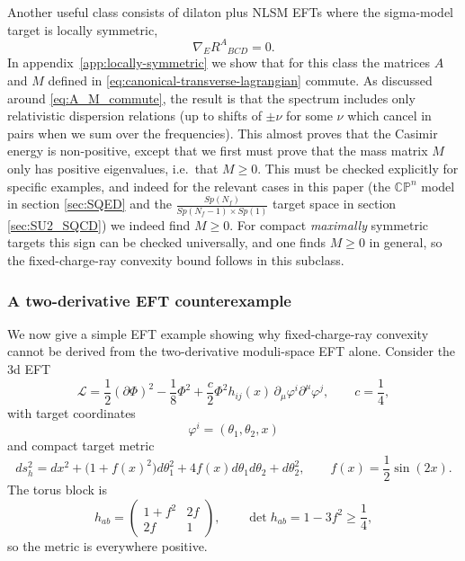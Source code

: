 \documentclass[a4paper,11pt]{article}
\begin{document}
Another useful class consists of dilaton plus NLSM EFTs where the sigma-model target is locally symmetric,
\begin{equation}\label{eq:locally-symmetric-condition-main}
  \nabla_E R^A{}_{BCD}=0 .
\end{equation}
In appendix~\ref{app:locally-symmetric} we show that for this class the matrices $A$ and $M$ defined in \eqref{eq:canonical-transverse-lagrangian} commute. As discussed around \eqref{eq:A_M_commute}, the result is that the spectrum includes only relativistic dispersion relations (up to shifts of $\pm \nu$ for some $\nu$ which cancel in pairs when we sum over the frequencies). This almost proves that the Casimir energy is non-positive, except that we first must prove that the mass matrix $M$ only has positive eigenvalues, i.e.~that $M\geq 0$. This must be checked explicitly for specific examples, and indeed for the relevant cases in this paper (the $\mathbb{CP}^{n}$ model in section \ref{sec:SQED} and the $\frac{Sp(N_f)}{Sp(N_f-1)\times Sp(1)}$ target space in section \ref{sec:SU2_SQCD}) we indeed find $M\geq 0$. For compact \textit{maximally} symmetric targets this sign can be checked universally, and one finds $M\geq0$ in general, so the fixed-charge-ray convexity bound follows in this subclass.




\subsubsection{A two-derivative EFT counterexample}\label{subsubsec:eft-counterexample-every-ray}

We now give a simple EFT example showing why fixed-charge-ray convexity cannot be derived from the two-derivative moduli-space EFT alone. Consider the 3d EFT
\begin{equation}
\mathcal L=\frac12(\partial\Phi)^2-\frac{1}{8}\Phi^2+\frac c2\Phi^2 h_{ij}(x)\,
\partial_\mu\varphi^i\partial^\mu\varphi^j,
\qquad
c=\frac14,
\end{equation}
with target coordinates
\begin{equation}
  \varphi^i=(\theta_1,\theta_2,x)
\end{equation}
and compact target metric
\begin{equation}\label{eq:counterexample-target-metric}
  ds_h^2 = dx^2 + \bigl(1+f(x)^2\bigr)d\theta_1^2 + 4f(x)d\theta_1d\theta_2 + d\theta_2^2, \qquad f(x)=\frac12\sin(2x).
\end{equation}
The torus block is
\begin{equation}
h_{ab}
=
\begin{pmatrix}
1+f^2 & 2f\\
2f & 1
\end{pmatrix},
\qquad
\det h_{ab}=1-3f^2\geq\frac14,
\end{equation}
so the metric is everywhere positive.
\end{document}
